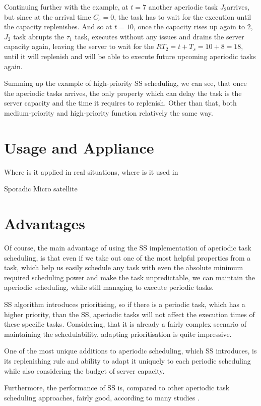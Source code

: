 \documentclass[conference]{IEEEtran}
\begin{document}
Continuing further with the example, at $t = 7$ another aperiodic task $J_2$arrives, but since at the arrival time $C_s = 0$, the task has to wait for the execution until the capacity replenishes. And so at $t = 10$, once the capacity rises up again to 2, $J_2$ task abrupts the $\tau_1$ task, executes without any issues and drains the server capacity again, leaving the server to wait for the $RT_2 = t + T_s = 10 + 8 = 18$, until it will replenish and will be able to execute future upcoming aperiodic tasks again.

Summing up the example of high-priority SS scheduling, we can see, that once the aperiodic tasks arrives, the only property which can delay the task is the server capacity and the time it requires to replenish. Other than that, both medium-priority and high-priority function relatively the same way.

\section{Usage and Appliance}
Where is it applied in real situations, where is it used in

Sporadic Micro satellite

\section{Advantages}
Of course, the main advantage of using the SS implementation of aperiodic task scheduling, is that even if we take out one of the most helpful properties from a task, which help us easily schedule any task with even the absolute minimum required scheduling power and make the task unpredictable, we can maintain the aperiodic scheduling, while still managing to execute periodic tasks.

SS algorithm introduces prioritising, so if there is a periodic task, which has a higher priority, than the SS, aperiodic tasks will not affect the execution times of these specific tasks. Considering, that it is already a fairly complex scenario of maintaining the schedulability, adapting prioritisation is quite impressive.

One of the most unique additions to aperiodic scheduling, which SS introduces, is its replenishing rule and ability to adapt it uniquely to each periodic scheduling while also considering the budget of server capacity.

Furthermore, the performance of SS is, compared to other aperiodic task scheduling approaches, fairly good, according to many studies \cite{b4}.
\end{document}
